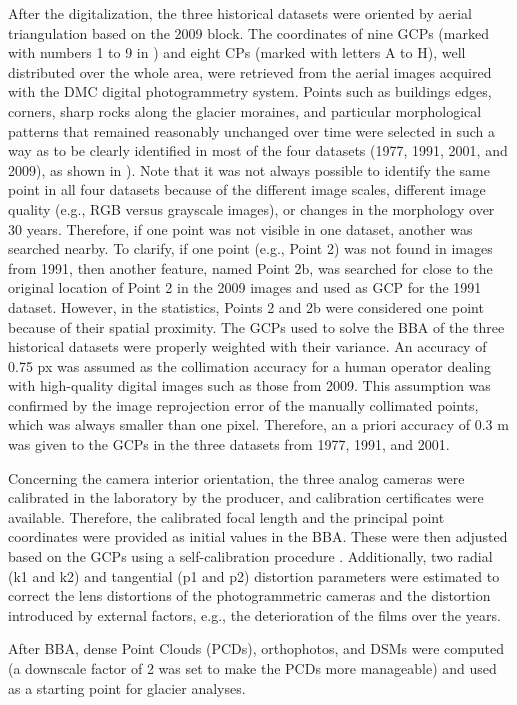 After the digitalization, the three historical datasets were oriented by aerial triangulation based on the 2009 block. The coordinates of nine GCPs (marked with numbers 1 to 9 in ) and eight CPs (marked with letters A to H), well distributed over the whole area, were retrieved from the aerial images acquired with the DMC digital photogrammetry system.
Points such as buildings edges, corners, sharp rocks along the glacier moraines, and particular morphological patterns that remained reasonably unchanged over time were selected in such a way as to be clearly identified in most of the four datasets (1977, 1991, 2001, and 2009), as shown in ).
Note that it was not always possible to identify the same point in all four datasets because of the different image scales, different image quality (e.g., RGB versus grayscale images), or changes in the morphology over 30 years. 
Therefore, if one point was not visible in one dataset, another was searched nearby.
To clarify, if one point (e.g., Point 2) was not found in images from 1991, then another feature, named Point 2b, was searched for close to the original location of Point 2 in the 2009 images and used as GCP for the 1991 dataset.
However, in the statistics, Points 2 and 2b were considered one point because of their spatial proximity.
The GCPs used to solve the BBA of the three historical datasets were properly weighted with their variance. 
An accuracy of 0.75 px was assumed as the collimation accuracy for a human operator dealing with high-quality digital images such as those from 2009. 
This assumption was confirmed by the image reprojection error of the manually collimated points, which was always smaller than one pixel. 
Therefore, an a priori accuracy of 0.3 m was given to the GCPs in the three datasets from 1977, 1991, and 2001.

Concerning the camera interior orientation, the three analog cameras were calibrated in the laboratory by the producer, and calibration certificates were available. 
Therefore, the calibrated focal length and the principal point coordinates were provided as initial values in the BBA. 
These were then adjusted based on the GCPs using a self-calibration procedure \citep{jacobsen2004issues}. Additionally, two radial (k1 and k2) and tangential (p1 and p2) distortion parameters were estimated to correct the lens distortions of the photogrammetric cameras and the distortion introduced by external factors, e.g., the deterioration of the films over the years.

After BBA, dense Point Clouds (PCDs), orthophotos, and DSMs were computed (a downscale factor of 2 was set to make the PCDs more manageable) and used as a starting point for glacier analyses.

